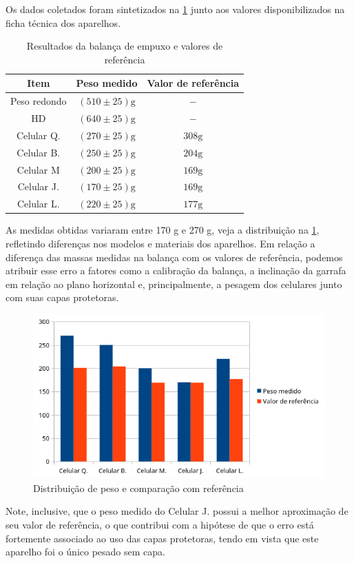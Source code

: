 Os dados coletados foram sintetizados na \cref{tab1} junto aos valores
disponibilizados na ficha técnica dos aparelhos.
\begin{table}[H]
    \caption{Resultados da balança de empuxo e valores de referência}
    \label{tab1}
    \begin{center}
        \begin{tabular}{c c c}
            \hline
            Item & Peso medido & Valor de referência\\
            \hline
            Peso redondo & \( (510 \pm 25) \unit{\gram} \) & \( - \) \\
            HD & \( (640 \pm 25) \unit{\gram} \) & \( - \) \\
            Celular Q. & \( (270 \pm 25) \unit{\gram} \) & \( 308 \unit{\gram} \) \\
            Celular B. & \( (250 \pm 25) \unit{\gram} \) & \( 204 \unit{\gram} \) \\
            Celular M & \( (200 \pm 25) \unit{\gram} \) & \( 169 \unit{\gram} \) \\
            Celular J. & \( (170 \pm 25) \unit{\gram} \) & \( 169 \unit{\gram} \) \\
            Celular L. & \( (220 \pm 25) \unit{\gram} \) & \( 177 \unit{\gram} \) \\
            \hline
    \end{tabular}
    \end{center}
\end{table}
As medidas obtidas variaram entre 170 g e 270 g, veja a distribuição na
\cref{pesos}, refletindo diferenças nos modelos e materiais dos aparelhos. Em
relação a diferença das massas medidas na balança com os valores de referência,
podemos atribuir esse erro a fatores como a calibração da balança, a inclinação
da garrafa em relação ao plano horizontal e, principalmente, a pesagem dos
celulares junto com suas capas protetoras.
\begin{figure}[H]
    \centering
    \includegraphics[width=.5\linewidth]{fig/pesos.png}
    \caption{Distribuição de peso e comparação com referência}
    \label{pesos}
\end{figure}
Note, inclusive, que o peso medido do Celular J. possui a melhor aproximação de
seu valor de referência, o que contribui com a hipótese de que o erro está
fortemente associado ao uso das capas protetoras, tendo em vista que este
aparelho foi o único pesado sem capa.


